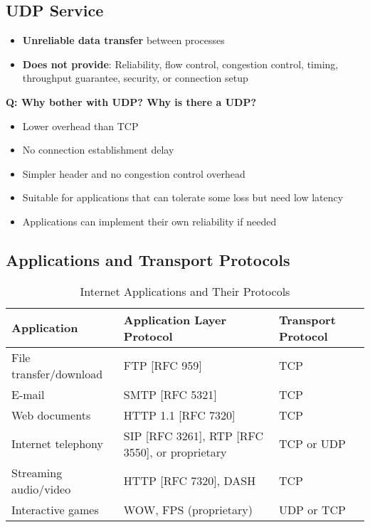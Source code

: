 \documentclass[12pt]{article}
\begin{document}
\subsection{UDP Service}
\begin{itemize}
    \item \textbf{Unreliable data transfer} between processes
    \item \textbf{Does not provide}: Reliability, flow control, congestion control, timing, throughput guarantee, security, or connection setup
\end{itemize}

\textbf{Q: Why bother with UDP? Why is there a UDP?}
\begin{itemize}
    \item Lower overhead than TCP
    \item No connection establishment delay
    \item Simpler header and no congestion control overhead
    \item Suitable for applications that can tolerate some loss but need low latency
    \item Applications can implement their own reliability if needed
\end{itemize}

\subsection{Applications and Transport Protocols}

\begin{table}[h]
    \centering
    \begin{tabular}{p{4cm}p{4cm}p{3cm}}
        \toprule
        \textbf{Application}   & \textbf{Application Layer Protocol}            & \textbf{Transport Protocol} \\
        \midrule
        File transfer/download & FTP [RFC 959]                                  & TCP                         \\
        E-mail                 & SMTP [RFC 5321]                                & TCP                         \\
        Web documents          & HTTP 1.1 [RFC 7320]                            & TCP                         \\
        Internet telephony     & SIP [RFC 3261], RTP [RFC 3550], or proprietary & TCP or UDP                  \\
        Streaming audio/video  & HTTP [RFC 7320], DASH                          & TCP                         \\
        Interactive games      & WOW, FPS (proprietary)                         & UDP or TCP                  \\
        \bottomrule
    \end{tabular}
    \caption{Internet Applications and Their Protocols}
    \label{tab:app-protocols}
\end{table}
\end{document}
